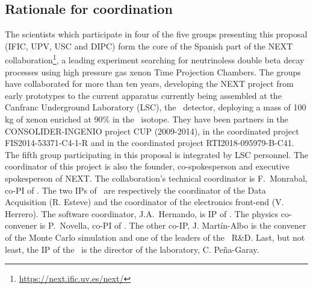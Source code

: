 \subsection{Rationale for coordination}
 The scientists which participate in four of the five groups presenting this proposal (IFIC, UPV, USC and DIPC) form the core of the Spanish part of the NEXT collaboration\footnote{\url{https://next.ific.uv.es/next/}}, a leading experiment searching for neutrinoless double beta decay processes using high pressure gas xenon Time Projection Chambers. The groups have collaborated for more than ten years, developing the NEXT project from early prototypes to the current apparatus currently being assembled at the Canfranc Underground Laboratory (LSC), the \Next\ detector, deploying a mass of 100 kg of xenon enriched at 90\% in the \XE\ isotope. They have been partners in the CONSOLIDER-INGENIO project CUP (2009-2014), in the coordinated project FIS2014-53371-C4-1-R and in the coordinated project RTI2018-095979-B-C41. The fifth group participating in this proposal is integrated by LSC personnel. The coordinator of this project is also the founder, co-spokesperson and executive spokesperson of NEXT.  The collaboration's technical coordinator is F.~Monrabal, co-PI of \sDIPC. The two IPs of \sUPV\ are respectively the coordinator of the Data Acquisition (R. Esteve) and the coordinator of the electronics front-end (V. Herrero). The software coordinator, J.A.~Hernando, is IP of \sUSC.  The physics co-convener is P.~Novella, co-PI of \sIFIC. The other co-IP, J. Martín-Albo is the convener of the Monte Carlo simulation and one of the leaders of the \NHD\ R\&D. Last, but not least, the IP of the \sLSC\ is the director of the laboratory, C. Pe\~na-Garay.  

  
% 
 
